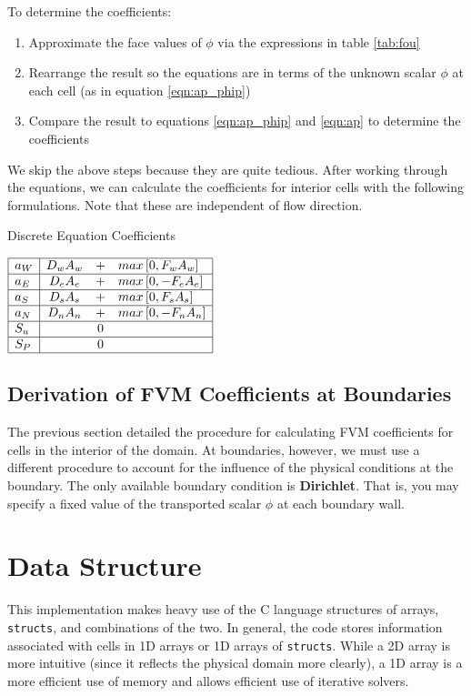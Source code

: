 \documentclass{article}
\newcommand{\DA}[1]{D_{#1} A_{#1}}
\newcommand{\FA}[1]{F_{#1} A_{#1}}
\begin{document}
To determine the coefficients:
\begin{enumerate}
    \item Approximate the face values of $\phi$ via the expressions in table \ref{tab:fou}
    \item Rearrange the result so the equations are in terms of the unknown scalar $\phi$ at each cell (as in equation \ref{eqn:ap_phip})
    \item Compare the result to equations \ref{eqn:ap_phip} and \ref{eqn:ap} to determine the coefficients
\end{enumerate}

We skip the above steps because they are quite tedious. After working through the equations, we can calculate the coefficients for interior cells with the following formulations. Note that these are independent of flow direction.

\begin{table}[!ht]
\caption{Discrete Equation Coefficients}
\centering
$\begin{array}{|l|ccl|} \hline
   a_W & \DA{w} &+& max\left[0,  \FA{w}\right] \\ \hline
   a_E & \DA{e} &+& max\left[0, -\FA{e}\right] \\ \hline
   a_S & \DA{s} &+& max\left[0,  \FA{s}\right] \\ \hline
   a_N & D_n A_n &+& max\left[0, -F_n A_n\right] \\ \hline
   S_u & & 0 & \\ \hline
   S_P & & 0 & \\ \hline
\end{array}$
\label{tab:coeffs}
\end{table}

\subsection{Derivation of FVM Coefficients at Boundaries}

The previous section detailed the procedure for calculating FVM coefficients for cells in the interior of the domain. At boundaries, however, we must use a different procedure to account for the influence of the physical conditions at the boundary. The only available boundary condition is \textbf{Dirichlet}. That is, you may specify a fixed value of the transported scalar $\phi$ at each boundary wall. 

\section{Data Structure}
This implementation makes heavy use of the C language structures of arrays, \verb|structs|, and combinations of the two. In general, the code stores information associated with cells in 1D arrays or 1D arrays of \texttt{structs}. While a 2D array is more intuitive (since it reflects the physical domain more clearly), a 1D array is a more efficient use of memory and allows efficient use of iterative solvers.
\end{document}

